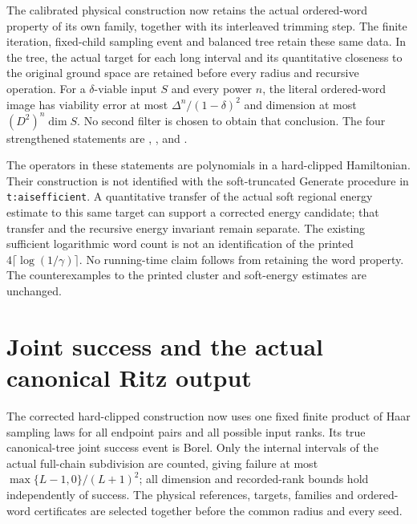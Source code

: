 \documentclass{article}
\begin{document}
The calibrated physical construction now retains the actual ordered-word
property of its own family, together with its interleaved trimming step.
The finite iteration, fixed-child sampling event and balanced tree retain
these same data. In the tree, the actual target for each long interval
and its quantitative closeness to the original ground space are retained
before every radius and recursive operation. For a $\delta$-viable
input $S$ and every power $n$, the literal ordered-word image has
viability error at most $\Delta^n/(1-\delta)^2$ and dimension at most
$(D^2)^n\dim S$. No second filter is chosen to obtain that conclusion.
The four strengthened statements are
,
,
and
.

The operators in these statements are polynomials in a hard-clipped
Hamiltonian. Their construction is not identified with the soft-truncated
Generate procedure in \texttt{t:aisefficient}. A quantitative transfer
of the actual soft regional energy estimate to this same target can
support a corrected energy candidate; that transfer and the recursive
energy invariant remain separate. The existing sufficient logarithmic
word count is not an identification of the printed
$4\lceil\log(1/\gamma)\rceil$. No running-time claim follows from
retaining the word property. The counterexamples to the printed cluster
and soft-energy estimates are unchanged.

\section{Joint success and the actual canonical Ritz output}

The corrected hard-clipped construction now uses one fixed finite product
of Haar sampling laws for all endpoint pairs and all possible input ranks.
Its true canonical-tree joint success event is Borel. Only the internal
intervals of the actual full-chain subdivision are counted, giving failure
at most $\max\{L-1,0\}/(L+1)^2$; all dimension and recorded-rank bounds
hold independently of success. The physical references, targets, families
and ordered-word certificates are selected together before the common
radius and every seed.
\end{document}
